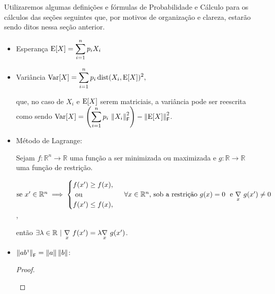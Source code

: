 
Utilizaremos algumas definições e fórmulas de Probabilidade e Cálculo para os cálculos das seções seguintes que, por motivos de organização e clareza, estarão sendo ditos nessa seção anterior.

\begin{itemize}
  \item Esperança $\displaystyle \text{E}[X] = \sum_{i=1}^{n} p_i X_i$
  \item Variância $\displaystyle \text{Var}[X] = \sum_{i=1}^{n} p_i \, \text{dist}(X_i, \text{E}[X])^2,$

  que, no caso de $X_i$ e $\text{E}[X]$ serem matriciais, a variância pode ser reescrita como sendo $\displaystyle \text{Var}[X] = \left(\sum_{i=1}^{n} p_i \, \left\lVert X_i\right\rVert_\mathsf{F}^2\right) - \left\lVert\text{E}[X]\right\rVert_\mathsf{F}^2$.

  \item Método de Lagrange:

    Sejam $f : \mathbb{R}^n \to \mathbb{R}$ uma função a ser minimizada ou maximizada e $g : \mathbb{R} \to \mathbb{R}$ uma função de restrição.

    $\text{se }x' \in \mathbb{R}^n \implies \begin{cases} f(x') \geq f(x), \\ \text{ ou } \\ f(x') \leq f(x), \end{cases} \,\, \forall x \in \mathbb{R}^n\text{, sob a restrição } g(x) = 0 \,\, \text{ e } \underset{x}{\nabla}\,\, g(x') \neq 0$,

    então $\exists \lambda \in \mathbb{R} \,\,|\,\, \underset{x}{\nabla}\,\, f(x') = \lambda \underset{x}{\nabla}\,\, g(x')$.

  \item $\left\lVert ab^{\scriptscriptstyle\mathsf{T}\mkern-1mu}\right\rVert_\mathsf{F} = \left\lVert a\right\rVert \left\lVert b\right\rVert$:

  \begin{proof}
    \begin{calculation}[=]
      \displaystyle {}
      \displaystyle {}
      \displaystyle {}
       
       
    \end{calculation}
  \end{proof}
\end{itemize}